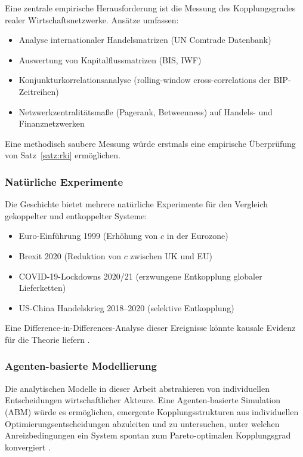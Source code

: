 ﻿\documentclass[a4paper,12pt]{article}
\theoremstyle{definition}
\begin{document}
Eine zentrale empirische Herausforderung ist die Messung des Kopplungsgrades realer
Wirtschaftsnetzwerke. Ansätze umfassen:
\begin{itemize}
    \item Analyse internationaler Handelsmatrizen (UN Comtrade Datenbank)
    \item Auswertung von Kapitalflussmatrizen (BIS, IWF)
    \item Konjunkturkorrelationsanalyse (rolling-window cross-correlations der BIP-Zeitreihen)
    \item Netzwerkzentralitätsmaße (Pagerank, Betweenness) auf Handels- und Finanznetzwerken
\end{itemize}
Eine methodisch saubere Messung würde erstmals eine empirische Überprüfung von
Satz~\ref{satz:rki} ermöglichen.

\subsubsection{Natürliche Experimente}

Die Geschichte bietet mehrere natürliche Experimente für den Vergleich gekoppelter und
entkoppelter Systeme:
\begin{itemize}
    \item Euro-Einführung 1999 (Erhöhung von $c$ in der Eurozone)
    \item Brexit 2020 (Reduktion von $c$ zwischen UK und EU)
    \item COVID-19-Lockdowns 2020/21 (erzwungene Entkopplung globaler Lieferketten)
    \item US-China Handelskrieg 2018--2020 (selektive Entkopplung)
\end{itemize}
Eine Difference-in-Differences-Analyse dieser Ereignisse könnte kausale Evidenz
für die Theorie liefern \citep{callaway2021difference}.

\subsubsection{Agenten-basierte Modellierung}

Die analytischen Modelle in dieser Arbeit abstrahieren von individuellen Entscheidungen
wirtschaftlicher Akteure. Eine Agenten-basierte Simulation (ABM) würde es ermöglichen,
emergente Kopplungsstrukturen aus individuellen Optimierungsentscheidungen abzuleiten
und zu untersuchen, unter welchen Anreizbedingungen ein System spontan zum Pareto-optimalen
Kopplungsgrad konvergiert \citep{tesfatsion2006handbook}.
\end{document}

